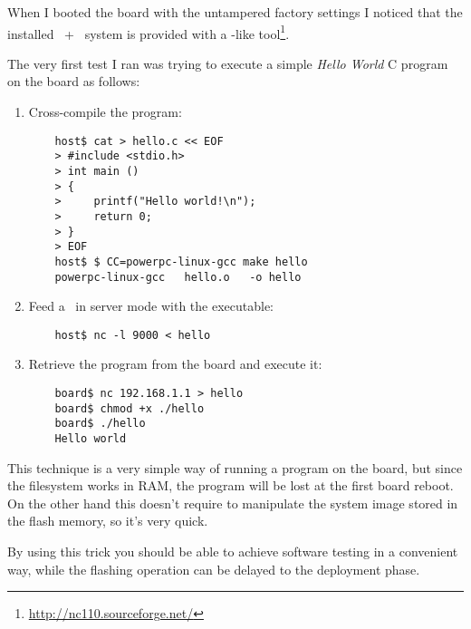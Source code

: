 When I booted the board with the untampered factory settings I noticed
that the installed \BusyBox\ + \Linux\ system is provided with a
\NetCat-like tool\footnote{\url{http://nc110.sourceforge.net/}}.

The very first test I ran was trying to execute a simple
\emph{Hello World} C program on the board as follows:
\begin{enumerate}

    \item   Cross-compile the program:

\begin{lstlisting}
    host$ cat > hello.c << EOF
    > #include <stdio.h>
    > int main ()
    > {
    >     printf("Hello world!\n");
    >     return 0;
    > }
    > EOF
    host$ $ CC=powerpc-linux-gcc make hello
    powerpc-linux-gcc   hello.o   -o hello
\end{lstlisting}

    \item   Feed a \NetCat\ in server mode with the executable:

\begin{lstlisting}
    host$ nc -l 9000 < hello
\end{lstlisting}

    \item   Retrieve the program from the board and execute it:

\begin{lstlisting}
    board$ nc 192.168.1.1 > hello
    board$ chmod +x ./hello
    board$ ./hello
    Hello world
\end{lstlisting}

\end{enumerate}


This technique is a very simple way of running a program on the board, but
since the filesystem works in RAM, the program will be lost at the first
board reboot. On the other hand this doesn't require to manipulate the
system image stored in the flash memory, so it's very quick.

By using this trick you should be able to achieve software testing in a
convenient way, while the flashing operation can be delayed to the
deployment phase.


